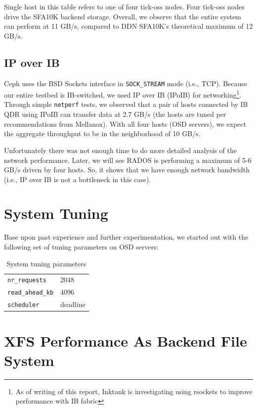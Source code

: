 \documentclass{article}
\begin{document}
Single host in this table refers to one of four tick-oss nodes. Four tick-oss
nodes drive the SFA10K backend storage. Overall, we observe that the entire
system can perform at 11 GB/s, compared to DDN SFA10K's theoretical maximum of
12 GB/s.


\subsection{IP over IB}

Ceph uses the BSD Sockets interface in \texttt{SOCK\_STREAM} mode (i.e., TCP).
Because our entire testbed is IB-switched, we used IP over IB (IPoIB) for
networking\footnote{As of writing of this report, Inktank is investigating using
rsockets to improve performance with IB fabric}. Through simple
\verb!netperf! tests, we observed that a pair of hosts connected by IB QDR using
IPoIB can transfer data at 2.7 GB/s (the hosts are tuned per recommendations
from Mellanox). With all four hosts (OSD servers), we expect the aggregate
throughput to be in the neighborhood of 10 GB/s.

Unfortunately there was not enough time to do more detailed analysis of the network
performance. Later, we will see RADOS is performing a
maximum of 5-6 GB/s driven by four hosts.  So, it shows that we
have enough network bandwidth (i.e., IP over IB is not a bottleneck in this
case).




\section{System Tuning}

Base upon past experience and further experimentation, we started out with the
following set of tuning parameters on OSD servers:

\begin{table}[htb]
\centering
\begin{tabular}{ll}
    \toprule
    \verb!nr_requests! & 2048 \\
    \verb!read_ahead_kb! & 4096 \\
    \verb!scheduler! & deadline \\
    \bottomrule
\end{tabular}
\caption{System tuning parameters}
\end{table}



\section{XFS Performance As Backend File System}
\end{document}
